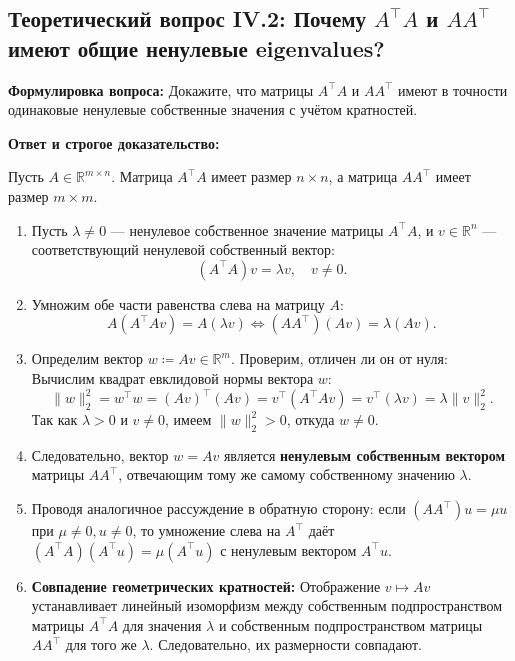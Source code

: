 
\subsection{Теоретический вопрос IV.2: Почему $A^\top A$ и $A A^\top$ имеют общие ненулевые eigenvalues?}
\textbf{Формулировка вопроса:} Докажите, что матрицы $A^\top A$ и $A A^\top$ имеют в точности одинаковые ненулевые
собственные значения с учётом кратностей.

\textbf{Ответ и строгое доказательство:}

Пусть $A \in \mathbb{R}^{m \times n}$.
Матрица $A^\top A$ имеет размер $n \times n$, а матрица $A A^\top$ имеет размер $m \times m$.
\begin{enumerate}
    \item Пусть $\lambda \ne 0$ — ненулевое собственное значение матрицы $A^\top A$, и $v \in \mathbb{R}^n$ —
    соответствующий ненулевой собственный вектор:
    \[ (A^\top A) v = \lambda v, \quad v \ne 0. \]
    \item Умножим обе части равенства слева на матрицу $A$:
    \[ A (A^\top A v) = A (\lambda v) \iff (A A^\top) (A v) = \lambda (A v). \]
    \item Определим вектор $w \coloneqq A v \in \mathbb{R}^m$.
    Проверим, отличен ли он от нуля:
    Вычислим квадрат евклидовой нормы вектора $w$:
    \[ \|w\|_2^2 = w^\top w = (A v)^\top (A v) = v^\top (A^\top A v) = v^\top (\lambda v) = \lambda \|v\|_2^2. \]
    Так как $\lambda > 0$ и $v \ne 0$, имеем $\|w\|_2^2 > 0$, откуда $w \ne 0$.
    \item Следовательно, вектор $w = Av$ является \textbf{ненулевым собственным вектором} матрицы $A A^\top$,
    отвечающим тому же самому собственному значению $\lambda$.
    \item Проводя аналогичное рассуждение в обратную сторону: если $(A A^\top) u = \mu u$ при $\mu \ne 0, u \ne 0$,
    то умножение слева на $A^\top$ даёт $(A^\top A)(A^\top u) = \mu (A^\top u)$ с ненулевым вектором $A^\top u$.
    \item \textbf{Совпадение геометрических кратностей:} Отображение $v \mapsto Av$ устанавливает линейный
    изоморфизм между собственным подпространством матрицы $A^\top A$ для значения $\lambda$ и собственным
    подпространством матрицы $A A^\top$ для того же $\lambda$.
    Следовательно, их размерности совпадают.
\end{enumerate}


